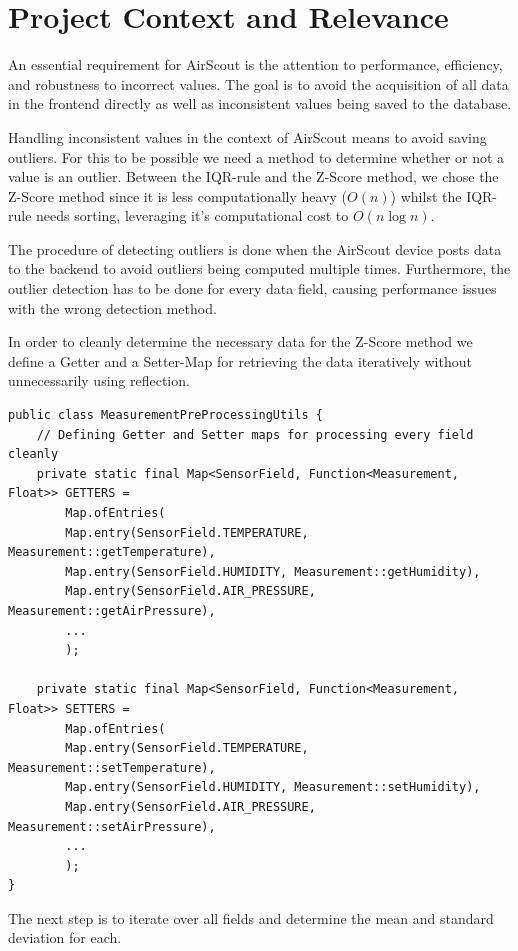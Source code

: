 \chapter{Project Context and Relevance}
An essential requirement for AirScout is the attention to performance, efficiency, and robustness to incorrect values. The goal is to avoid the acquisition of all data in the frontend directly as well as inconsistent values being saved to the database.

Handling inconsistent values in the context of AirScout means to avoid saving outliers. For this to be possible we need a method to determine whether or not a value is an outlier. Between the IQR-rule and the Z-Score method, we chose the Z-Score method since it is less computationally heavy ($O(n)$) whilst the IQR-rule needs sorting, leveraging it's computational cost to $O(n \log n)$.

The procedure of detecting outliers is done when the AirScout device posts data to the backend to avoid outliers being computed multiple times. Furthermore, the outlier detection has to be done for every data field, causing performance issues with the wrong detection method.

In order to cleanly determine the necessary data for the Z-Score method we define a Getter and a Setter-Map for retrieving the data iteratively without unnecessarily using reflection.

\begin{lstlisting}[language={[AS]Java},caption=Detecting outliers in Measurement list]
public class MeasurementPreProcessingUtils {
    // Defining Getter and Setter maps for processing every field cleanly
    private static final Map<SensorField, Function<Measurement, Float>> GETTERS =
        Map.ofEntries(
        Map.entry(SensorField.TEMPERATURE, Measurement::getTemperature),
        Map.entry(SensorField.HUMIDITY, Measurement::getHumidity),
        Map.entry(SensorField.AIR_PRESSURE, Measurement::getAirPressure),
        ...
        );

    private static final Map<SensorField, Function<Measurement, Float>> SETTERS =
        Map.ofEntries(
        Map.entry(SensorField.TEMPERATURE, Measurement::setTemperature),
        Map.entry(SensorField.HUMIDITY, Measurement::setHumidity),
        Map.entry(SensorField.AIR_PRESSURE, Measurement::setAirPressure),
        ...
        );
}
\end{lstlisting}

The next step is to iterate over all fields and determine the mean and standard deviation for each.

